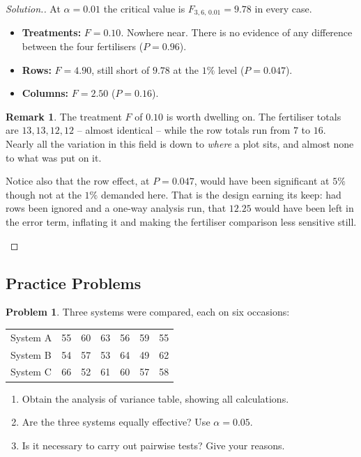 \documentclass[11pt,a4paper]{article}
\theoremstyle{definition}
\newtheorem{remark}[thm]{Remark}
\newtheorem{problemx}{Problem}[section]
\newenvironment{problem}{\begin{problemx}}{\end{problemx}}
\newenvironment{solution}
  {\renewcommand{\qedsymbol}{}\begin{proof}[\textit{Solution}.]}
  {\end{proof}}
\begin{document}
\begin{solution}
At $\alpha=0.01$ the critical value is $F_{3,6,\,0.01}=9.78$ in every case.
\begin{itemize}
\item \textbf{Treatments:} $F=0.10$. Nowhere near. There is no evidence of any difference
between the four fertilisers ($P=0.96$).
\item \textbf{Rows:} $F=4.90$, still short of $9.78$ at the $1\%$ level ($P=0.047$).
\item \textbf{Columns:} $F=2.50$ ($P=0.16$).
\end{itemize}

\begin{remark}
The treatment $F$ of $0.10$ is worth dwelling on. The fertiliser totals are $13, 13, 12,
12$ -- almost identical -- while the row totals run from $7$ to $16$. Nearly all the
variation in this field is down to \emph{where} a plot sits, and almost none to what was
put on it.

Notice also that the row effect, at $P=0.047$, would have been significant at $5\%$ though
not at the $1\%$ demanded here. That is the design earning its keep: had rows been ignored
and a one-way analysis run, that $12.25$ would have been left in the error term, inflating
it and making the fertiliser comparison less sensitive still.
\end{remark}
\end{solution}








\pagebreak
\subsection{Practice Problems}

\begin{problem}
Three systems were compared, each on six occasions:
\begin{table}[H]
\centering
\begin{tabular}{lcccccc}
System A & 55 & 60 & 63 & 56 & 59 & 55\\
System B & 54 & 57 & 53 & 64 & 49 & 62\\
System C & 66 & 52 & 61 & 60 & 57 & 58\\
\end{tabular}
\end{table}
\begin{enumerate}
\item[(a).] Obtain the analysis of variance table, showing all calculations.
\item[(b).] Are the three systems equally effective? Use $\alpha=0.05$.
\item[(c).] Is it necessary to carry out pairwise tests? Give your reasons.
\end{enumerate}
\end{problem}
\end{document}
